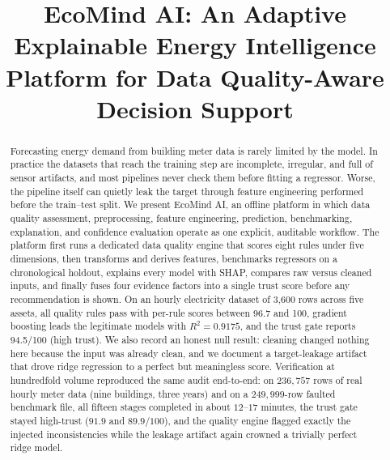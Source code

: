 \documentclass[conference]{IEEEtran}
\begin{document}
\title{EcoMind AI: An Adaptive Explainable Energy Intelligence Platform for Data Quality-Aware Decision Support}

\author{
}

\maketitle

\begin{abstract}
Forecasting energy demand from building meter data is rarely limited by the model. In practice the datasets that reach the training step are incomplete, irregular, and full of sensor artifacts, and most pipelines never check them before fitting a regressor. Worse, the pipeline itself can quietly leak the target through feature engineering performed before the train--test split. We present EcoMind AI, an offline platform in which data quality assessment, preprocessing, feature engineering, prediction, benchmarking, explanation, and confidence evaluation operate as one explicit, auditable workflow. The platform first runs a dedicated data quality engine that scores eight rules under five dimensions, then transforms and derives features, benchmarks regressors on a chronological holdout, explains every model with SHAP, compares raw versus cleaned inputs, and finally fuses four evidence factors into a single trust score before any recommendation is shown. On an hourly electricity dataset of 3,600 rows across five assets, all quality rules pass with per-rule scores between 96.7 and 100, gradient boosting leads the legitimate models with $R^2 = 0.9175$, and the trust gate reports 94.5/100 (high trust). We also record an honest null result: cleaning changed nothing here because the input was already clean, and we document a target-leakage artifact that drove ridge regression to a perfect but meaningless score. Verification at hundredfold volume reproduced the same audit end-to-end: on $236{,}757$ rows of real hourly meter data (nine buildings, three years) and on a $249{,}999$-row faulted benchmark file, all fifteen stages completed in about $12$--$17$ minutes, the trust gate stayed high-trust ($91.9$ and $89.9/100$), and the quality engine flagged exactly the injected inconsistencies while the leakage artifact again crowned a trivially perfect ridge model.
\end{abstract}
\end{document}
